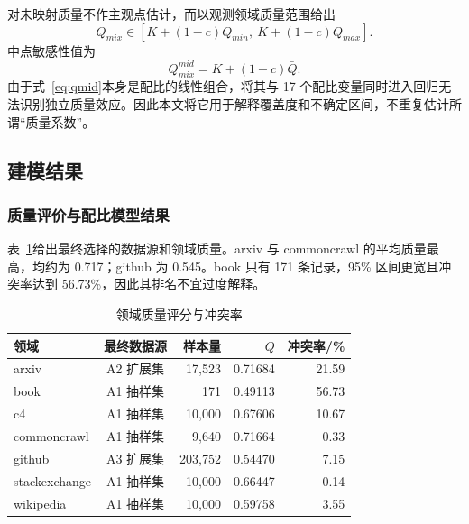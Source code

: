 \documentclass[bwprint]{gmcmthesis}
\numberwithin{equation}{section}
\numberwithin{figure}{section}
\numberwithin{table}{section}
\begin{document}
        对未映射质量不作主观点估计，而以观测领域质量范围给出
        \begin{equation}
        Q_{mix}\in\left[K+(1-c)Q_{min},\ K+(1-c)Q_{max}\right].
        \label{eq:partial}
        \end{equation}
        中点敏感性值为
        \begin{equation}
        Q_{mix}^{mid}=K+(1-c)\bar Q.
        \label{eq:qmid}
        \end{equation}
        由于式~\eqref{eq:qmid}本身是配比的线性组合，将其与 17 个配比变量同时进入回归无法识别独立质量效应。因此本文将它用于解释覆盖度和不确定区间，不重复估计所谓``质量系数''。


    \subsection{建模结果}   %
        \subsubsection{质量评价与配比模型结果}
        表~\ref{tab:domainq}给出最终选择的数据源和领域质量。arxiv 与 commoncrawl 的平均质量最高，均约为 0.717；github 为 0.545。book 只有 171 条记录，95\% 区间更宽且冲突率达到 56.73\%，因此其排名不宜过度解释。
    
        \begin{table}[H]    %
        \centering
        \caption{领域质量评分与冲突率}
        \label{tab:domainq}
        \begin{tabular}{lcrrr}
        \toprule
        领域 & 最终数据源 & 样本量 & $Q$ & 冲突率/\% \\
        \midrule
        arxiv & A2 扩展集 & 17,523 & 0.71684 & 21.59 \\
        book & A1 抽样集 & 171 & 0.49113 & 56.73 \\
        c4 & A1 抽样集 & 10,000 & 0.67606 & 10.67 \\
        commoncrawl & A1 抽样集 & 9,640 & 0.71664 & 0.33 \\
        github & A3 扩展集 & 203,752 & 0.54470 & 7.15 \\
        stackexchange & A1 抽样集 & 10,000 & 0.66447 & 0.14 \\
        wikipedia & A1 抽样集 & 10,000 & 0.59758 & 3.55 \\
        \bottomrule
        \end{tabular}
        \end{table}
        
\end{document}
